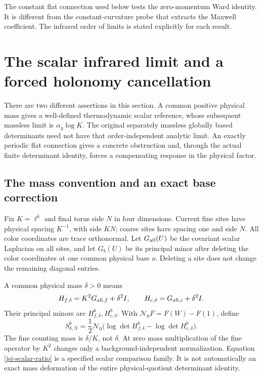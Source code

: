 \documentclass[11pt]{article}
\theoremstyle{remark}
\begin{document}
The constant flat connection used below tests the
zero-momentum Ward identity. It is different from the
constant-curvature probe that extracts the Maxwell
coefficient. The infrared order of limits is stated
explicitly for each result.



\section{The scalar infrared limit and a forced holonomy cancellation}
\label{jsi-section}

There are two different assertions in this section. A common positive
physical mass gives a well-defined thermodynamic scalar reference,
whose subsequent massless limit is \(\alpha_g\log K\). The original
separately massless globally based determinants need not have that
order-independent analytic limit. An exactly periodic flat connection
gives a concrete obstruction and, through the actual finite determinant
identity, forces a compensating response in the physical factor.

\subsection{The mass convention and an exact base correction}
\label{jsi-mass-section}

Fix \(K=\ell^k\) and final torus side \(N\) in four dimensions.
Current fine sites have physical spacing \(K^{-1}\), with side \(KN\);
coarse sites have spacing one and side \(N\).
All color coordinates are trace orthonormal.
Let \(G_{\rm all}(U)\) be the covariant scalar Laplacian on all sites,
and let \(G_b(U)\) be its principal minor after deleting the color
coordinates at one common physical base \(o\). Deleting a site does
not change the remaining diagonal entries.

A common physical mass \(\delta>0\) means
\begin{equation}
 H_{f,\delta}=K^2G_{{\rm all},f}+\delta^2I,\qquad
 H_{c,\delta}=G_{{\rm all},c}+\delta^2I.
 \label{jsi-mass}
\end{equation}
Their principal minors are \(H_{f,\delta}^b,H_{c,\delta}^b\).
With \(\mathcal N_0F=F(W)-F(1)\), define
\begin{equation}
 S_{\delta,N}^b=\frac12\mathcal N_0
       \bigl(\log\det H_{f,\delta}^b-\log\det H_{c,\delta}^b\bigr).
 \label{jsi-scalar-ratio}
\end{equation}
The fine counting mass is \(\delta/K\), not \(\delta\).
At zero mass multiplication of the fine operator by \(K^2\)
changes only a background-independent normalization.
Equation \eqref{jsi-scalar-ratio} is a specified scalar comparison
family. It is not automatically an exact mass deformation of the
entire physical-quotient determinant identity.
\end{document}
